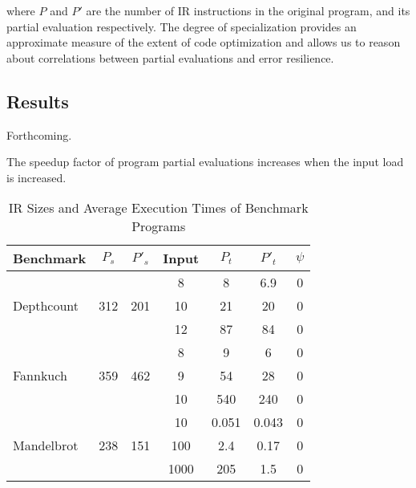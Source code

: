 where $P$ and $P'$ are the number of IR instructions in the original program, and its partial evaluation respectively.
The degree of specialization provides an approximate measure of the extent of code optimization and allows us to reason about correlations between partial evaluations and error resilience.


\subsection{Results}
\label{sec:results}
Forthcoming.

\begin{obs}
  \label{obs:density}
  The speedup factor of program partial evaluations increases when the input load is increased.   
\end{obs}

\begin{table}[htbp]
\small{
\begin{center}
    \begin{tabular}{|p{1.7cm}|c|c|c|c|c|c|}
    \hline
    \textbf{Benchmark} & \textbf{$P_s$} & \textbf{$P'_s$} &  \textbf{Input} & \textbf{$P_t$} & \textbf{$P'_t$} & $\psi$ \\ \hline
    \multirow{3}{*}{Depthcount}
    & & & 8 & 8 & 6.9 & 0\\
	& 312 & 201 & 10 & 21 & 20 & 0 \\
 	& & & 12 & 87 & 84 & 0 \\ \hline
 	\multirow{3}{*}{Fannkuch}
    & & & 8 & 9 & 6 & 0\\
	& 359 & 462 & 9 & 54 & 28 & 0 \\
 	& & & 10 & 540 & 240 & 0 \\ \hline
 	\multirow{3}{*}{Mandelbrot}
    & & & 10 & 0.051 & 0.043 & 0\\
	& 238 & 151 & 100 & 2.4 & 0.17 & 0 \\
 	& & & 1000 & 205 & 1.5 & 0 \\ \hline
    \hline
    \end{tabular}
    \end{center}
    }
    \caption{IR Sizes and Average Execution Times of Benchmark Programs}
    \label{tab:benchmarks}
\end{table}
